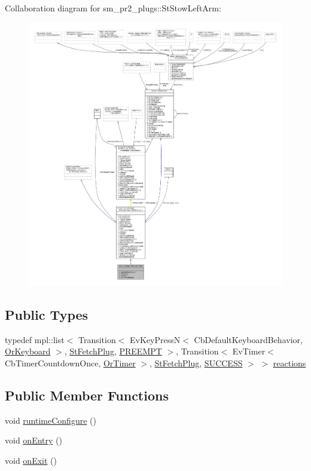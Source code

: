 Collaboration diagram for sm\+\_\+pr2\+\_\+plugs\+:\+:St\+Stow\+Left\+Arm\+:
\nopagebreak
\begin{figure}[H]
\begin{center}
\leavevmode
\includegraphics[width=350pt]{structsm__pr2__plugs_1_1StStowLeftArm__coll__graph}
\end{center}
\end{figure}
\subsection*{Public Types}
\begin{DoxyCompactItemize}
\item 
typedef mpl\+::list$<$ Transition$<$ Ev\+Key\+PressN$<$ Cb\+Default\+Keyboard\+Behavior, \hyperlink{classsm__pr2__plugs_1_1OrKeyboard}{Or\+Keyboard} $>$, \hyperlink{structsm__pr2__plugs_1_1StFetchPlug}{St\+Fetch\+Plug}, \hyperlink{classPREEMPT}{P\+R\+E\+E\+M\+PT} $>$, Transition$<$ Ev\+Timer$<$ Cb\+Timer\+Countdown\+Once, \hyperlink{classsm__pr2__plugs_1_1OrTimer}{Or\+Timer} $>$, \hyperlink{structsm__pr2__plugs_1_1StFetchPlug}{St\+Fetch\+Plug}, \hyperlink{classSUCCESS}{S\+U\+C\+C\+E\+SS} $>$ $>$ \hyperlink{structsm__pr2__plugs_1_1StStowLeftArm_a87f889e0a7e42c40fabfc6d4af5256f0}{reactions}
\end{DoxyCompactItemize}
\subsection*{Public Member Functions}
\begin{DoxyCompactItemize}
\item 
void \hyperlink{structsm__pr2__plugs_1_1StStowLeftArm_af3124c3f8bc9a03f7af8c49dd0469856}{runtime\+Configure} ()
\item 
void \hyperlink{structsm__pr2__plugs_1_1StStowLeftArm_adeafa4a6ef10da3da9499ebb3f55467f}{on\+Entry} ()
\item 
void \hyperlink{structsm__pr2__plugs_1_1StStowLeftArm_a3d4e9a20c6dc825b9b5b3c51c14928a8}{on\+Exit} ()
\end{DoxyCompactItemize}
